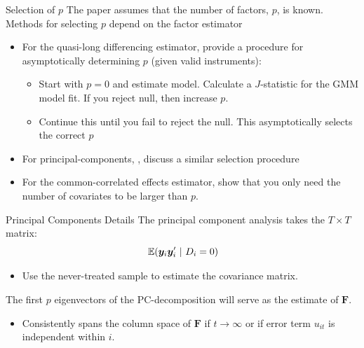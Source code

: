 \documentclass[aspectratio=169,t,11pt]{beamer}
\begin{document}
\begin{frame}{Selection of $p$}\label{slide:appendix-selecting_p}
  The paper assumes that the number of factors, $p$, is known. Methods for selecting $p$ depend on the factor estimator
  
  \begin{itemize}
    \item For the quasi-long differencing estimator, \citet{Ahn_Lee_Schmidt_2013} provide a procedure for asymptotically determining $p$ (given valid instruments):
    \begin{itemize}
      \item Start with $p = 0$ and estimate model. Calculate a $J$-statistic for the GMM model fit. If you reject null, then increase $p$.
      \item Continue this until you fail to reject the null. This asymptotically selects the correct $p$
    \end{itemize}
  
    \smallskip
    \item For principal-components, \citet{Xu_2017}, discuss a similar selection procedure
 
    \smallskip
    \item For the common-correlated effects estimator, \citet{Brown_Butts_Westerlund_2023} show that you only need the number of covariates to be larger than $p$.
  \end{itemize}

\end{frame}


\begin{frame}{Principal Components Details}\label{slide:appendix-pc_details}
  The principal component analysis takes the $T \times T$ matrix:
  $$
    \expec{\bm{y}_i \bm{y}_i'}{D_i = 0}
  $$
  \vspace{-\medskipamount}
  \begin{itemize}
    \item Use the never-treated sample to estimate the covariance matrix.
  \end{itemize}

  \bigskip
  The first $p$ eigenvectors of the PC-decomposition will serve as the estimate of $\bm{F}$.
  \begin{itemize}
    \item Consistently spans the column space of $\bm{F}$ if $t \to \infty$ or if error term $u_{it}$ is independent within $i$.
  \end{itemize}

\end{frame}
\end{document}
